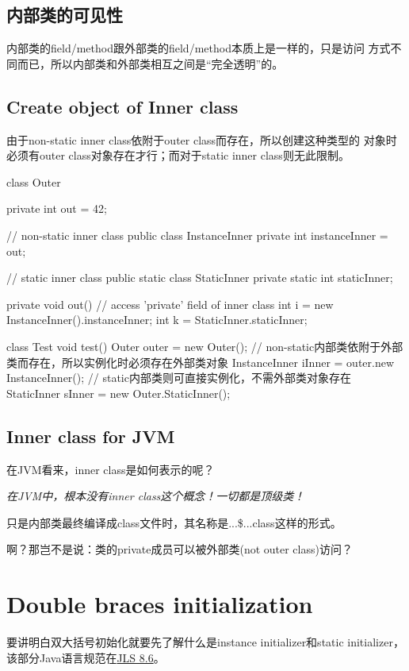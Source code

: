 \documentclass[a4paper,11pt]{article}
\begin{document}
\subsection[内部类的可见性]{内部类的可见性}
内部类的field/method跟外部类的field/method本质上是一样的，只是访问
方式不同而已，所以内部类和外部类相互之间是“完全透明”的。

\subsection[Create object of Inner class ]{Create object of Inner class}
由于non-static inner class依附于outer class而存在，所以创建这种类型的
对象时必须有outer class对象存在才行；而对于static inner class则无此限制。

\begin{javacode}
class Outer {
  private int out = 42;

  // non-static inner class
  public class InstanceInner {
    private int instanceInner = out;
  }

  // static inner class
  public static class StaticInner {
    private static int staticInner;
  }

  private void out() {
    // access 'private' field of inner class
    int i = new InstanceInner().instanceInner;
    int k = StaticInner.staticInner;
  }
}

class Test {
  void test() {
    Outer outer = new Outer();
    // non-static内部类依附于外部类而存在，所以实例化时必须存在外部类对象
    InstanceInner iInner = outer.new InstanceInner();
    // static内部类则可直接实例化，不需外部类对象存在
    StaticInner sInner = new Outer.StaticInner();
  }
}
\end{javacode}

\subsection[Inner class for JVM]{Inner class for JVM}
在JVM看来，inner class是如何表示的呢？

\emph{在JVM中，根本没有inner class这个概念！一切都是顶级类！}

只是内部类最终编译成class文件时，其名称是...\$...class这样的形式。

啊？那岂不是说：类的private成员可以被外部类(not outer class)访问？


\section[Double braces initialization]{Double braces initialization}
要讲明白双大括号初始化就要先了解什么是instance initializer和static initializer，
该部分Java语言规范在\href{http://docs.oracle.com/javase/specs/jls/se7/html/jls-8.html#jls-8.6}{JLS 8.6}。
\end{document}
